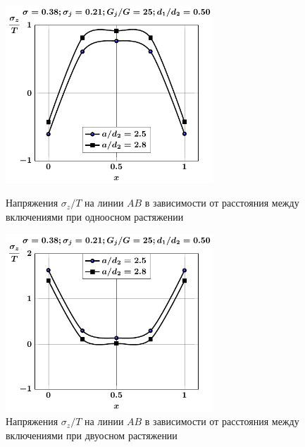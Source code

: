 \begin{russian}
\begin{figure}[h!]
\centering\footnotesize
\parbox[b]{7.5cm}{\centering\includegraphics[width=7.8cm]{periodic-oblate-inc27-a-d50-g25-t1-sig_z.pdf}
\caption{Напряжения $\sigma_z/T$ на линии $AB$ в зависимости от расстояния между включениями при одноосном растяжении
\label{f:11:47}}}\hfil\hfil
\parbox[b]{7.5cm}{\centering\includegraphics[width=7.8cm]{periodic-oblate-inc27-a-d50-g25-t2-sig_z.pdf}
\caption{Напряжения $\sigma_z/T$ на линии $AB$ в зависимости от расстояния между включениями при двуосном растяжении
\label{f:11:48}}}
\end{figure}


\end{russian}

